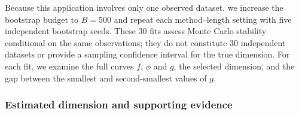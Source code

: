 \documentclass[
  11pt,
  a4paper,
]{article}
\begin{document}
Because this application involves only one observed dataset, we increase
the bootstrap budget to \(B=500\) and repeat each method--length setting
with five independent bootstrap seeds. These \(30\) fits assess Monte
Carlo stability conditional on the same observations; they do not
constitute \(30\) independent datasets or provide a sampling confidence
interval for the true dimension. For each fit, we examine the full
curves \(f\), \(\phi\) and \(g\), the selected dimension, and the gap
between the smallest and second-smallest values of \(g\).

\hypertarget{estimated-dimension-and-supporting-evidence}{%
\subsubsection{Estimated dimension and supporting
evidence}\label{estimated-dimension-and-supporting-evidence}}
\end{document}
